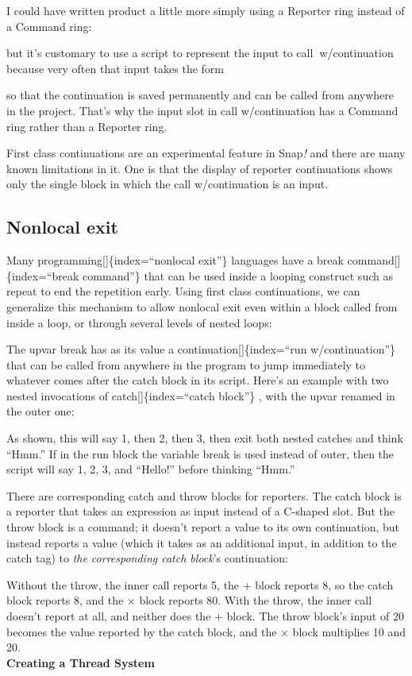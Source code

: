 \documentclass[
  letterpaper,
]{book}
\begin{document}
I could have written product a little more simply using a Reporter ring
instead of a Command ring:

but it's customary to use a script to represent the input to
call\textbf{~}w/continuation because very often that input takes the
form

so that the continuation is saved permanently and can be called from
anywhere in the project. That's why the input slot in call
w/continuation has a Command ring rather than a Reporter ring.

First class continuations are an experimental feature in Snap\emph{!}
and there are many known limitations in it. One is that the display of
reporter continuations shows only the single block in which the call
w/continuation is an input.

\subsection{Nonlocal exit}\label{nonlocal-exit}

Many programming{[}{]}\{index=``nonlocal exit''\} languages have a break
command{[}{]}\{index=``break command''\} that can be used inside a
looping construct such as repeat to end the repetition early. Using
first class continuations, we can generalize this mechanism to allow
nonlocal exit even within a block called from inside a loop, or through
several levels of nested loops:

The upvar break has as its value a continuation{[}{]}\{index=``run
w/continuation''\} that can be called from anywhere in the program to
jump immediately to whatever comes after the catch block in its script.
Here's an example with two nested invocations of
catch{[}{]}\{index=``catch block''\} , with the upvar renamed in the
outer one:

As shown, this will say 1, then 2, then 3, then exit both nested catches
and think ``Hmm.'' If in the run block the variable break is used
instead of outer, then the script will say 1, 2, 3, and ``Hello!''
before thinking ``Hmm.''

There are corresponding catch and throw blocks for reporters. The catch
block is a reporter that takes an expression as input instead of a
C-shaped slot. But the throw block is a command; it doesn't report a
value to its own continuation, but instead reports a value (which it
takes as an additional input, in addition to the catch tag) to \emph{the
corresponding catch block}'s continuation:

Without the throw, the inner call reports 5, the + block reports 8, so
the catch block reports 8, and the × block reports 80. With the throw,
the inner call doesn't report at all, and neither does the + block. The
throw block's input of 20 becomes the value reported by the catch block,
and the × block multiplies 10 and 20.\\
\textbf{Creating a Thread System}
\end{document}

